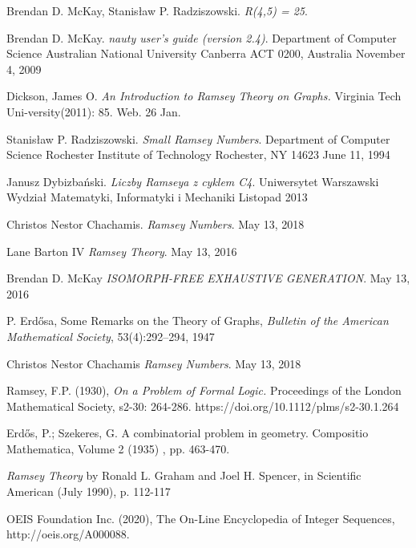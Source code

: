
\pagebreak
\begin{thebibliography}{9}
  Brendan D. McKay, Stanisław P. Radziszowski. 
  \textit{R(4,5) = 25}. 
  
  Brendan D. McKay.
  \textit{nauty user's guide (version 2.4)}.  
  Department of Computer Science
  Australian National University
  Canberra ACT 0200, Australia
  November 4, 2009
  
  Dickson, James O. \textit{An Introduction to Ramsey Theory on Graphs.}
  Virginia Tech Uni-versity(2011):  85. Web. 26 Jan.

  Stanisław P. Radziszowski.
  \textit{Small Ramsey Numbers}.  
  Department of Computer Science Rochester Institute of Technology Rochester, NY 14623
  June 11, 1994

  Janusz Dybizbański.
  \textit{Liczby Ramseya z cyklem C4}.  
  Uniwersytet Warszawski
  Wydział Matematyki, Informatyki i Mechaniki
  Listopad 2013

  Christos Nestor Chachamis.
  \textit{Ramsey Numbers}.  
  May 13, 2018

  Lane Barton IV
  \textit{Ramsey Theory}.  
  May 13, 2016

  Brendan D. McKay
  \textit{ISOMORPH-FREE EXHAUSTIVE GENERATION}.  
  May 13, 2016
  
  P.  Erdősa,  Some  Remarks  on  the  Theory  of  Graphs,
  \textit{Bulletin  of  the  American  Mathematical  Society},
  53(4):292–294,  1947
  
  Christos Nestor Chachamis
  \textit{Ramsey Numbers}.  
  May 13, 2018

 Ramsey, F.P. (1930), 
 \textit{On a Problem of Formal Logic.}
 Proceedings of the London Mathematical Society, s2-30: 264-286. https://doi.org/10.1112/plms/s2-30.1.264
 
 Erdős, P.; Szekeres, G.
 A combinatorial problem in geometry. Compositio Mathematica, Volume 2 (1935) , pp. 463-470.
  
  \textit{Ramsey Theory}
   by Ronald L. Graham and Joel H. Spencer, in Scientific American (July 1990), p. 112-117
   
       OEIS Foundation Inc. (2020), The On-Line Encyclopedia of Integer Sequences, http://oeis.org/A000088.


\end{thebibliography}
